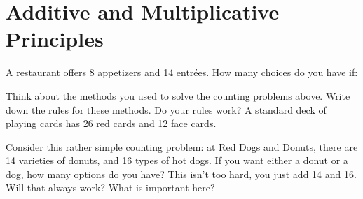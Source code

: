 \documentclass[12pt]{article}
\begin{document}
\section{Additive and Multiplicative Principles}

\begin{activity}
\begin{questions}
\question A restaurant offers 8 appetizers and 14 entr\'ees.  How many choices do you have if:
\question Think about the methods you used to solve the counting problems above.  Write down the rules for these methods.
\question Do your rules work?  A standard deck of playing cards has 26 red cards and 12 face cards.

\end{questions}

\end{activity}


Consider this rather simple counting problem: at Red Dogs and Donuts, there are 14 varieties of donuts, and 16 types of hot dogs.  If you want either a donut or a dog, how many options do you have?  This isn't too hard, you just add 14 and 16.  Will that always work?  What is important here?
\end{document}
